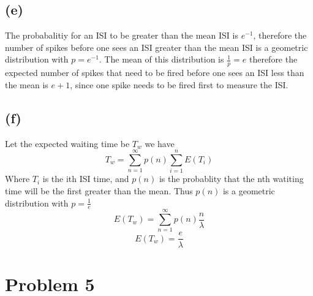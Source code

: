 \documentclass[12pt]{article}
\begin{document}
\subsection*{(e)}
The probabalitiy for an ISI to be greater than the mean ISI is $e^{-1}$, therefore the 
number of spikes before one sees an ISI greater than the mean ISI is a geometric distribution
with $p=e^{-1}$. The mean of this distribution is $\frac{1}{p}=e$ therefore the expected number of spikes
that need to be fired before one sees an ISI less than the mean is $\boxed{e+1}$, since one spike needs to be fired first to measure the ISI.
\subsection*{(f)}
Let the expected waiting time be $T_w$ we have
$$T_w=\sum_{n=1}^\infty p(n) \sum_{i=1}^{n}E(T_i)$$
Where $T_i$ is the ith ISI time, and $p(n)$ is the probablity that the nth watiting time will be the
first greater than the mean. Thus $p(n)$ is a geometric distribution with $p=\frac{1}{e}$
$$E(T_w)=\sum_{n=1}^{\infty} p(n)\frac{n}{\lambda}$$
$$E(T_w)=\boxed{\frac{e}{\lambda}}$$
\section*{Problem 5}
\end{document}
